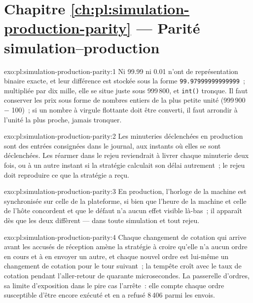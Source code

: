 \section*{Chapitre \ref{ch:pl:simulation-production-parity} --- Parité simulation--production}

\begin{solution}{exo:pl:simulation-production-parity:1}
Ni 99.99 ni 0.01 n'ont de représentation binaire exacte, et leur différence est stockée sous la forme
\texttt{99.97999999999999}~; multipliée par dix mille, elle se situe juste
sous 999\,800, et \texttt{int()} tronque. Il faut conserver les prix sous forme de nombres entiers de la plus petite unité (999\,900 $-$ 100)~; si un nombre à virgule flottante doit être
converti, il faut arrondir à l'unité la plus proche, jamais tronquer.
\end{solution}

\begin{solution}{exo:pl:simulation-production-parity:2}
Les minuteries déclenchées en production sont des entrées consignées dans le journal, aux instants où elles se sont déclenchées. Les réarmer dans le rejeu
reviendrait à livrer chaque minuterie deux fois, ou à un autre instant si la stratégie calculait son délai autrement~; le rejeu doit reproduire ce que la
stratégie a reçu.
\end{solution}

\begin{solution}{exo:pl:simulation-production-parity:3}
En production, l'horloge de la machine est synchronisée sur celle de la plateforme, si bien que l'heure de la machine et celle de l'hôte concordent et que le défaut n'a aucun
effet visible là-bas~; il apparaît dès que les deux diffèrent --- dans toute simulation et tout rejeu.
\end{solution}

\begin{solution}{exo:pl:simulation-production-parity:4}
Chaque changement de cotation qui arrive avant les accusés de réception amène la stratégie à croire qu'elle n'a aucun ordre en cours et à en envoyer un autre, et chaque
nouvel ordre est lui-même un changement de cotation pour le tour suivant~; la tempête croît avec le taux de cotation pendant l'aller-retour de quarante microsecondes. La
passerelle d'ordres, sa limite d'exposition dans le pire cas l'arrête~: elle compte chaque ordre susceptible d'être encore exécuté et en a refusé 8\,406 parmi les envois.
\end{solution}

